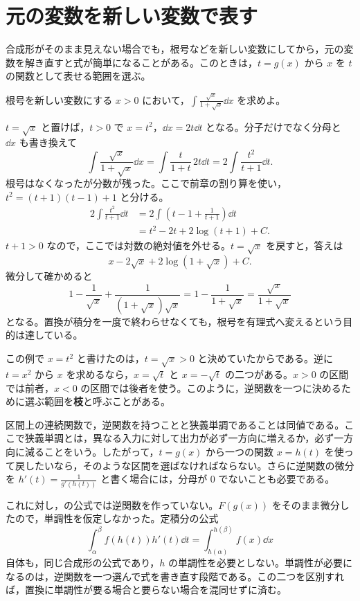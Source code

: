 \section{元の変数を新しい変数で表す}\label{節:逆向きの置換}

合成形がそのまま見えない場合でも，根号などを新しい変数にしてから，元の変数を解き直すと式が簡単になることがある。このときは，$t=g(x)$ から $x$ を $t$ の関数として表せる範囲を選ぶ。

\begin{example}{根号を新しい変数にする}
$x>0$ において，$\int\frac{\sqrt{x}}{1+\sqrt{x}}\dd x$ を求めよ。
\end{example}

$t=\sqrt{x}$ と置けば，$t>0$ で $x=t^2$，$\dd x=2t\dd t$ となる。分子だけでなく分母と $\dd x$ も書き換えて
\[
 \int\frac{\sqrt{x}}{1+\sqrt{x}}\dd x
 =\int\frac{t}{1+t}\,2t\dd t
 =2\int\frac{t^2}{t+1}\dd t.
\]
根号はなくなったが分数が残った。ここで前章の割り算を使い，$t^2=(t+1)(t-1)+1$ と分ける。
\[
\begin{aligned}
 2\int\frac{t^2}{t+1}\dd t
 &=2\int\left(t-1+\frac1{t+1}\right)\dd t\\
 &=t^2-2t+2\log(t+1)+C.
\end{aligned}
\]
$t+1>0$ なので，ここでは対数の絶対値を外せる。$t=\sqrt{x}$ を戻すと，答えは
\[
 x-2\sqrt{x}+2\log(1+\sqrt{x})+C.
\]
微分して確かめると
\[
 1-\frac1{\sqrt{x}}+\frac1{(1+\sqrt{x})\sqrt{x}}
 =1-\frac1{1+\sqrt{x}}
 =\frac{\sqrt{x}}{1+\sqrt{x}}
\]
となる。置換が積分を一度で終わらせなくても，根号を有理式へ変えるという目的は達している。

この例で $x=t^2$ と書けたのは，$t=\sqrt{x}>0$ と決めていたからである。逆に $t=x^2$ から $x$ を求めるなら，$x=\sqrt{t}$ と $x=-\sqrt{t}$ の二つがある。$x>0$ の区間では前者，$x<0$ の区間では後者を使う。このように，逆関数を一つに決めるために選ぶ範囲を\textbf{枝}と呼ぶことがある。

区間上の連続関数で，逆関数を持つことと狭義単調であることは同値である。ここで狭義単調とは，異なる入力に対して出力が必ず一方向に増えるか，必ず一方向に減ることをいう。したがって，$t=g(x)$ から一つの関数 $x=h(t)$ を使って戻したいなら，そのような区間を選ばなければならない。さらに逆関数の微分を $h'(t)=\frac1{g'(h(t))}$ と書く場合には，分母が $0$ でないことも必要である。

これに対し，の公式では逆関数を作っていない。$F(g(x))$ をそのまま微分したので，単調性を仮定しなかった。定積分の公式
\[
 \int_\alpha^\beta f(h(t))h'(t)\dd t
 =\int_{h(\alpha)}^{h(\beta)}f(x)\dd x
\]
自体も，同じ合成形の公式であり，$h$ の単調性を必要としない。単調性が必要になるのは，逆関数を一つ選んで式を書き直す段階である。この二つを区別すれば，置換に単調性が要る場合と要らない場合を混同せずに済む。

